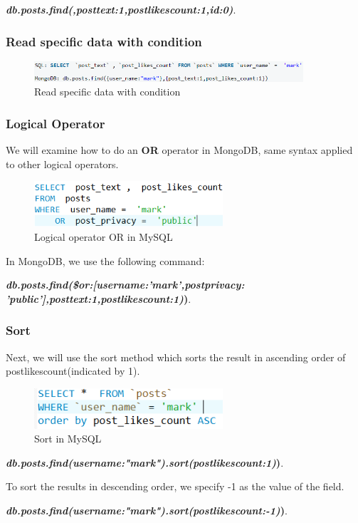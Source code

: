 \documentclass[conference]{IEEEtran}
\begin{document}
\begin{center}
\textbf{\textit{db.posts.find({},{posttext:1,postlikescount:1,id:0})}}.
\end{center}
\subsubsection{Read specific data with condition}
\begin{figure}[H]
    \centering
    \includegraphics[width=10cm]{read4}
    \caption{Read specific data with condition}
    \label{fig:fig4}
\end{figure}
\subsubsection{Logical Operator}
We will examine how to do an \textbf{OR} operator in MongoDB, same syntax applied to other logical operators.
\begin{figure}[H]
    \centering
    \includegraphics[width=7cm]{orsql}
    \caption{Logical operator OR in MySQL}
    \label{fig:fig4}
\end{figure}
In MongoDB, we use the following command:
\begin{center}
\textbf{\textit{db.posts.find({\$or:[{username:'mark'},{postprivacy: 'public'}]},{posttext:1,postlikescount:1})})}.
\end{center}
\subsubsection{Sort}

Next, we will use the sort method which sorts the result in ascending order of postlikescount(indicated by 1).
\begin{figure}[H]
    \centering
    \includegraphics[width=7cm]{sortsql}
    \caption{Sort in MySQL}
    \label{fig:fig4}
\end{figure}
\begin{center}
\textbf{\textit{db.posts.find({username:"mark"}).sort({postlikescount:1})})}.
\end{center}
To sort the results in descending order,  we specify -1 as the value of the field.
\begin{center}
\textbf{\textit{db.posts.find({username:"mark"}).sort({postlikescount:-1})})}.
\end{center}
\end{document}
